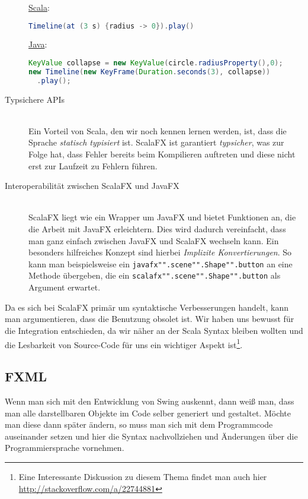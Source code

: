\begin{description}
\underline{Scala}:
\begin{lstlisting}[language=scala,caption=Scala Beispiel für eine einface Animation,numbers=none]
Timeline(at (3 s) {radius -> 0}).play()
\end{lstlisting}

\underline{Java}:
\begin{lstlisting}[language=Java,caption=Das selbe Beispiel in Java,numbers=none]
KeyValue collapse = new KeyValue(circle.radiusProperty(),0);
new Timeline(new KeyFrame(Duration.seconds(3), collapse))
  .play();
\end{lstlisting}

\item[Typsichere APIs]\hfill\\
Ein Vorteil von Scala, den wir noch kennen lernen werden, ist, dass die Sprache \textit{statisch typisiert} ist. ScalaFX ist garantiert \textit{typsicher}, was zur Folge hat, dass Fehler bereits beim Kompilieren auftreten und diese nicht erst zur Laufzeit zu Fehlern führen. ~\cite{TypesAndProgrammingLanguages}

\item[Interoperabilität zwischen ScalaFX und JavaFX]\hfill\\
ScalaFX liegt wie ein Wrapper um JavaFX und bietet Funktionen an, die die Arbeit mit JavaFX erleichtern. Dies wird dadurch vereinfacht, dass man ganz einfach zwischen JavaFX und ScalaFX wechseln kann. Ein besonders hilfreiches Konzept sind hierbei \textit{Implizite Konvertierungen}. So kann man beispielsweise ein \texttt{javafx"".scene"".Shape"".button} an eine Methode übergeben, die ein \texttt{scalafx"".scene"".Shape"".button} als Argument erwartet.
\end{description}

Da es sich bei ScalaFX primär um syntaktische Verbesserungen handelt, kann man argumentieren, dass die Benutzung obsolet ist. Wir haben uns bewusst für die Integration entschieden, da wir näher an der Scala Syntax bleiben wollten und die Lesbarkeit von Source-Code für uns ein wichtiger Aspekt ist\footnote{Eine Interessante Diskussion zu diesem Thema findet man auch hier \url{http://stackoverflow.com/a/22744881}}.


\subsection{FXML}\label{sec:fxml}
Wenn man sich mit den Entwicklung von Swing auskennt, dann weiß man, dass man alle darstellbaren Objekte im Code selber generiert und gestaltet. Möchte man diese dann später ändern, so muss man sich mit dem Programmcode auseinander setzen und hier die Syntax nachvollziehen und Änderungen über die Programmiersprache vornehmen.

